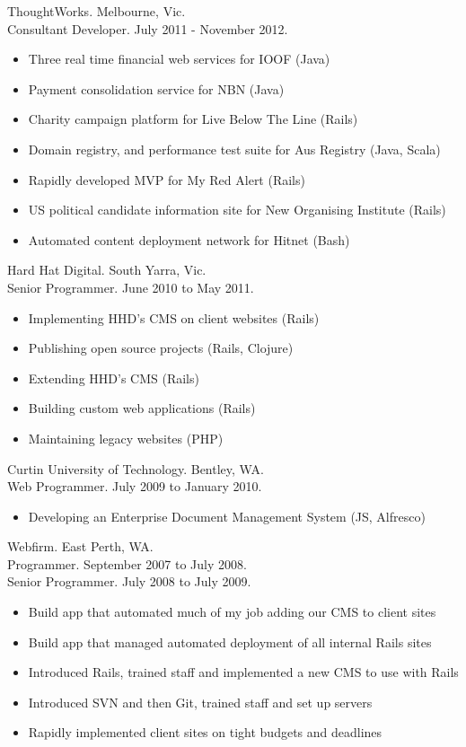 \documentclass[margin]{res}
\begin{document}
\begin{resume}
  ThoughtWorks. Melbourne, Vic. \\
  Consultant Developer.  July 2011 - November 2012.
  \begin{itemize}
  \item Three real time financial web services for IOOF (Java)
  \item Payment consolidation service for NBN (Java)
  \item Charity campaign platform for Live Below The Line (Rails)
  \item Domain registry, and performance test suite for Aus Registry (Java,
    Scala)
  \item Rapidly developed MVP for My Red Alert (Rails)
  \item US political candidate information site for New Organising Institute
    (Rails)
  \item Automated content deployment network for Hitnet (Bash)
  \end{itemize} 

  Hard Hat Digital. South Yarra, Vic. \\
  Senior Programmer.  June 2010 to May 2011.
  \begin{itemize}
  \item Implementing HHD's CMS on client websites (Rails)
  \item Publishing open source projects (Rails, Clojure)
  \item Extending HHD's CMS (Rails)
  \item Building custom web applications (Rails)
  \item Maintaining legacy websites (PHP)
  \end{itemize} 

  Curtin University of Technology. Bentley, WA. \\
  Web Programmer.  July 2009 to January 2010.
  \begin{itemize}
  \item Developing an Enterprise Document Management System (JS, Alfresco)
  \end{itemize} 

  Webfirm. East Perth, WA. \\
  Programmer.  September 2007 to July 2008. \\
  Senior Programmer. July 2008 to July 2009.
  \begin{itemize}
  \item Build app that automated much of my job adding our CMS to client sites
  \item Build app that managed automated deployment of all internal Rails sites
  \item Introduced Rails, trained staff and implemented a new CMS to use with
    Rails
  \item Introduced SVN and then Git, trained staff and set up servers
  \item Rapidly implemented client sites on tight budgets and deadlines
  \end{itemize} 


\end{resume}
\end{document}
